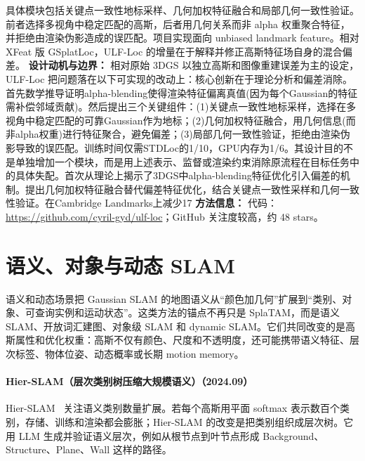 具体模块包括关键点一致性地标采样、几何加权特征融合和局部几何一致性验证。前者选择多视角中稳定匹配的高斯，后者用几何关系而非 alpha 权重聚合特征，并拒绝由渲染伪影造成的误匹配。项目实现面向 unbiased landmark feature。相对 XFeat 版 GSplatLoc，ULF-Loc 的增量在于解释并修正高斯特征场自身的混合偏差。
\textbf{设计动机与边界：} 相对原始 3DGS 以独立高斯和图像重建误差为主的设定，ULF-Loc 把问题落在以下可实现的改动上：核心创新在于理论分析和偏差消除。首先数学推导证明alpha-blending使得渲染特征偏离真值(因为每个Gaussian的特征需补偿邻域贡献)。然后提出三个关键组件：(1)关键点一致性地标采样，选择在多视角中稳定匹配的可靠Gaussian作为地标；(2)几何加权特征融合，用几何信息(而非alpha权重)进行特征聚合，避免偏差；(3)局部几何一致性验证，拒绝由渲染伪影导致的误匹配。训练时间仅需STDLoc的1/10，GPU内存为1/6。其设计目的不是单独增加一个模块，而是用上述表示、监督或渲染约束消除原流程在目标任务中的具体失配。首次从理论上揭示了3DGS中alpha-blending特征优化引入偏差的机制。提出几何加权特征融合替代偏差特征优化，结合关键点一致性采样和几何一致性验证。在Cambridge Landmarks上减少17%
\textbf{方法信息：} 代码：\url{https://github.com/cyril-gyd/ulf-loc}；GitHub 关注度较高，约 48 stars。



\section{语义、对象与动态 SLAM}

语义和动态场景把 Gaussian SLAM 的地图语义从“颜色加几何”扩展到“类别、对象、可查询实例和运动状态”。这类方法的锚点不再只是 SplaTAM，而是语义 SLAM、开放词汇建图、对象级 SLAM 和 dynamic SLAM。它们共同改变的是高斯属性和优化权重：高斯不仅有颜色、尺度和不透明度，还可能携带语义特征、层次标签、物体位姿、动态概率或长期 motion memory。


\paragraph{Hier-SLAM（层次类别树压缩大规模语义）（2024.09）}
Hier-SLAM~\cite{2409_12518} 关注语义类别数量扩展。若每个高斯用平面 softmax 表示数百个类别，存储、训练和渲染都会膨胀；Hier-SLAM 的改变是把类别组织成层次树。它用 LLM 生成并验证语义层次，例如从根节点到叶节点形成 Background、Structure、Plane、Wall 这样的路径。

